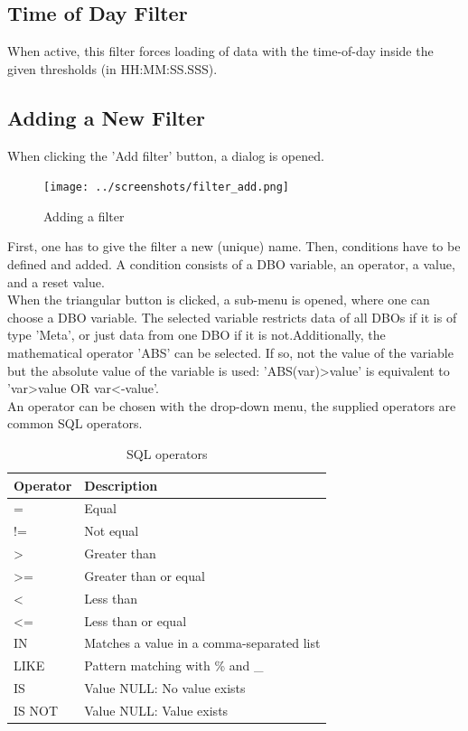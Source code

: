 \subsection{Time of Day Filter}

When active, this filter forces loading of data with the time-of-day inside the given thresholds (in HH:MM:SS.SSS).

\subsection{Adding a New Filter}
When clicking the 'Add filter' button, a dialog is opened.

\begin{figure}[H]
  \center
    \texttt{[image: ../screenshots/filter\_add.png]}
  \caption{Adding a filter}
  \label{fig:filter_add}
\end{figure}

First, one has to give the filter a new (unique) name. Then, conditions have to be defined and added. A condition consists of a DBO variable, an operator, a value, and a reset value. \\

When the triangular button is clicked, a sub-menu is opened, where one can choose a DBO variable. The selected variable restricts data of all DBOs if it is of type 'Meta', or just data from one DBO if it is not.Additionally, the mathematical operator 'ABS' can be selected. If so, not the value of the variable but the absolute value of the variable is used: 'ABS(var)>value' is equivalent to 'var>value OR var<-value'. \\

An operator can be chosen with the drop-down menu, the supplied operators are common SQL operators.

\begin{table}[H]
  \center
  \begin{tabular}{ | l | l |}
    \hline
    \textbf{Operator} & \textbf{Description} \\ \hline
    = & Equal \\ \hline
    != & Not equal \\ \hline
    > & Greater than \\ \hline
    >= & Greater than or equal \\ \hline
    < & Less than \\ \hline
    <= & Less than or equal \\ \hline
    IN & Matches a value in a comma-separated list \\ \hline
    LIKE & Pattern matching with \% and \_ \\ \hline
    IS & Value NULL: No value exists \\ \hline
    IS NOT & Value NULL: Value exists \\
    \hline
  \end{tabular}
  \caption{SQL operators}
\end{table}

